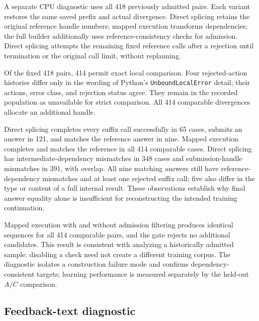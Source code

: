 \begin{table}[htbp]
 \centering\small
 \caption{Offline suffix construction on 414 strictly comparable historical training pairs. Four further pairs remain explicitly unavailable for exact replay within the fixed population of 418.}
 \label{tab:construction-en}
 \RecoveryConstructionTableEN
\end{table}

A separate CPU diagnostic uses all 418 previously admitted pairs. Each variant restores the same saved prefix and actual divergence. Direct splicing retains the original reference handle numbers; mapped execution transforms dependencies; the full builder additionally uses reference-consistency checks for admission. Direct splicing attempts the remaining fixed reference calls after a rejection until termination or the original call limit, without replanning.

Of the fixed 418 pairs, 414 permit exact local comparison. Four rejected-action histories differ only in the wording of Python's \texttt{UnboundLocalError} detail; their actions, error class, and rejection status agree. They remain in the recorded population as unavailable for strict comparison. All 414 comparable divergences allocate an additional handle.

Direct splicing completes every suffix call successfully in 65 cases, submits an answer in 121, and matches the reference answer in nine. Mapped execution completes and matches the reference in all 414 comparable cases. Direct splicing has intermediate-dependency mismatches in 348 cases and submission-handle mismatches in 391, with overlap. All nine matching answers still have reference-dependency mismatches and at least one rejected suffix call; five also differ in the type or content of a full internal result. These observations establish why final answer equality alone is insufficient for reconstructing the intended training continuation.

Mapped execution with and without admission filtering produces identical sequences for all 414 comparable pairs, and the gate rejects no additional candidates. This result is consistent with analyzing a historically admitted sample: disabling a check need not create a different training corpus. The diagnostic isolates a construction failure mode and confirms dependency-consistent targets; learning performance is measured separately by the held-out $A/C$ comparison.

\subsection{Feedback-text diagnostic}

